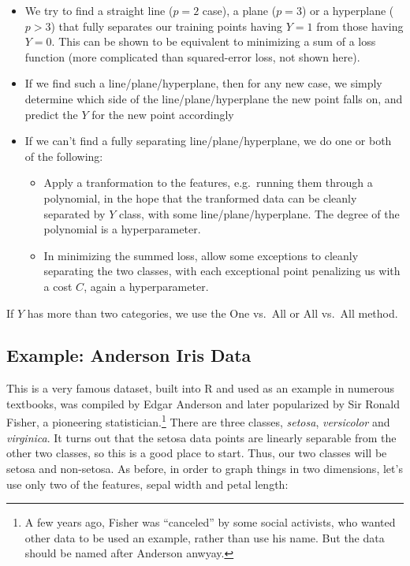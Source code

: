 \begin{itemize}

\item We try to find a straight line ($p = 2$ case), a plane ($p = 3$)
or a hyperplane ($p > 3$) that fully separates our training points
having $Y = 1$ from those having $Y = 0$.  This can be shown to be
equivalent to minimizing a sum of a loss function (more complicated than
squared-error loss, not shown here).

\item If we find such a line/plane/hyperplane, then for any new case, we
simply determine which side of the line/plane/hyperplane the new point
falls on, and predict the $Y$ for the new point accordingly

\item If we can't find a fully separating line/plane/hyperplane, we do
one or both of the following:

   \begin{itemize}

   \item Apply a tranformation to the features, e.g.\ running them
   through a polynomial, in the hope that the tranformed data can be
   cleanly separated by $Y$ class, with some line/plane/hyperplane.  The
   degree of the polynomial is a hyperparameter.

   \item In minimizing the summed loss, allow some exceptions to cleanly
   separating the two classes, with each exceptional point penalizing us
   with a cost $C$, again a hyperparameter.
   
   \end{itemize} 

\end{itemize} 

If $Y$ has more than two categories, we use the One vs.\ All or All vs.\
All method.

\subsection{Example:  Anderson Iris Data}

This is a very famous dataset, built into R and used as an example in
numerous textbooks, was compiled by Edgar Anderson and later popularized
by Sir Ronald Fisher, a pioneering statistician.\footnote{A few years
ago, Fisher was ``canceled'' by some social activists, who wanted other
data to be used an example, rather than use his name.  But the data
should be named after Anderson anwyay.} There are three classes,
\textit{setosa}, \textit{versicolor} and \textit{virginica}.  It turns
out that the setosa data points are linearly separable from the other
two classes, so this is a good place to start.  Thus, our two classes
will be setosa and non-setosa.  As before, in order to graph things in
two dimensions, let's use only two of the features, sepal width and
petal length:

